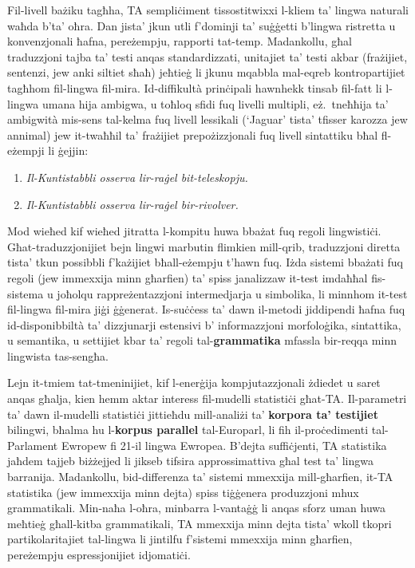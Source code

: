 \begin{multicols}{2}
Fil-livell bażiku tagħha, TA sempliċiment tissostitwixxi l-kliem ta' lingwa naturali waħda b'ta' oħra. Dan jista’ jkun utli f'dominji ta' suġġetti b’lingwa ristretta u konvenzjonali ħafna, pereżempju, rapporti tat-temp. 
Madankollu, għal traduzzjoni tajba ta’ testi anqas standardizzati, unitajiet ta’ testi akbar (frażijiet, sentenzi, jew anki siltiet sħaħ) jeħtieġ li jkunu mqabbla mal-eqreb kontropartijiet tagħhom fil-lingwa fil-mira. Id-diffikultà prinċipali hawnhekk tinsab fil-fatt li l-lingwa umana hija ambigwa, u toħloq  sfidi fuq livelli multipli, eż.~tneħħija ta’ ambigwità mis-sens tal-kelma fuq livell lessikali (`Jaguar' tista’ tfisser karozza jew annimal) jew it-twaħħil ta’ frażijiet prepożizzjonali fuq livell sintattiku bħal fl-eżempji li ġejjin:

\begin{enumerate}%
\item \emph{Il-Kuntistabbli osserva lir-raġel bit-teleskopju.}
\item \emph{Il-Kuntistabbli osserva lir-raġel bir-rivolver.}
\end{enumerate}

Mod wieħed kif wieħed jitratta l-kompitu huwa bbażat fuq regoli lingwistiċi. Għat-traduzzjonijiet bejn lingwi marbutin flimkien mill-qrib, traduzzjoni diretta tista’ tkun possibbli f'każijiet bħall-eżempju t’hawn fuq. Iżda sistemi bbażati fuq regoli (jew immexxija minn għarfien) ta’ spiss janalizzaw it-test imdaħħal fis-sistema u joħolqu rappreżentazzjoni intermedjarja u simbolika, li minnhom it-test fil-lingwa fil-mira jiġi ġġenerat. Is-suċċess ta’ dawn il-metodi jiddipendi ħafna fuq id-disponibbiltà ta’ dizzjunarji estensivi b’ informazzjoni morfoloġika, sintattika, u semantika, u settijiet kbar ta’ regoli tal-\textbf{grammatika} mfassla bir-reqqa minn lingwista tas-sengħa.


Lejn it-tmiem tat-tmeninijiet, kif l-enerġija kompjutazzjonali żdiedet u saret anqas għalja, kien hemm aktar interess fil-mudelli statistiċi għat-TA. Il-parametri ta’ dawn il-mudelli statistiċi jittieħdu mill-analiżi ta’ \textbf{korpora ta’ testijiet} bilingwi, bħalma hu l-\textbf{korpus parallel} tal-Europarl, li fih il-proċedimenti tal-Parlament Ewropew fi 21-il lingwa Ewropea. B’dejta suffiċjenti, TA statistika jaħdem tajjeb biżżejjed li jikseb tifsira approssimattiva għal test ta’ lingwa barranija. Madankollu, bid-differenza ta’ sistemi mmexxija mill-għarfien, it-TA statistika (jew immexxija minn dejta) spiss tiġġenera produzzjoni mhux grammatikali. Min-naħa l-oħra, minbarra l-vantaġġ li anqas sforz uman huwa meħtieġ għall-kitba grammatikali, TA mmexxija minn dejta tista’ wkoll tkopri partikolaritajiet tal-lingwa li jintilfu f’sistemi mmexxija minn għarfien, pereżempju espressjonijiet idjomatiċi.


\end{multicols}
